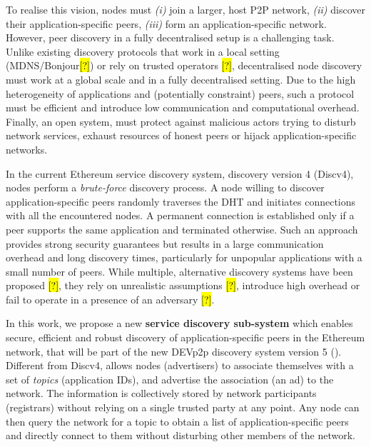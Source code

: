 To realise this vision, nodes must \textit{(i)} join a larger, host P2P network, \textit{(ii)} discover their application-specific peers, \textit{(iii)} form an application-specific network. However, peer discovery in a fully decentralised setup is a challenging task. Unlike existing discovery protocols that work in a local setting (MDNS/Bonjour\hl{[?]}) or rely on trusted operators \hl{[?]}, decentralised node discovery must work at a global scale and in a fully decentralised setting. Due to the high heterogeneity of applications and (potentially constraint) peers, such a protocol must be efficient and introduce low communication and computational overhead. Finally, an open system, must protect against malicious actors trying to disturb network services, exhaust resources of honest peers or hijack application-specific networks. 

 In the current Ethereum service discovery system, \ie discovery version 4 (Discv4), nodes perform a \textit{brute-force} discovery process. A node willing to discover application-specific peers randomly traverses the DHT and initiates connections with all the encountered nodes. A permanent connection is established only if a peer supports the same application and terminated otherwise. Such an approach provides strong security guarantees but results in a large communication overhead and long discovery times, particularly for unpopular applications with a small number of peers. While multiple, alternative discovery systems have been proposed \hl{[?]}, they rely on unrealistic assumptions \hl{[?]}, introduce high overhead or fail to operate in a presence of an adversary \hl{[?]}. 

 In this work, we propose a new \textbf{service discovery sub-system} which enables secure,  efficient and robust  discovery of application-specific peers in the Ethereum network,  that will be part of the new DEVp2p  discovery system version 5 (\textit{\sysname}).
Different from Discv4, \sysname allows nodes (\ie advertisers) to associate themselves with a set of \emph{topics} (\eg application IDs), and advertise the association (\ie an ad) to the network. The information is collectively stored by network participants (\ie registrars) without relying on a single trusted party at any point. Any node can then query the network for a topic to obtain a list of application-specific peers and directly connect to them without disturbing other members of the network. 

